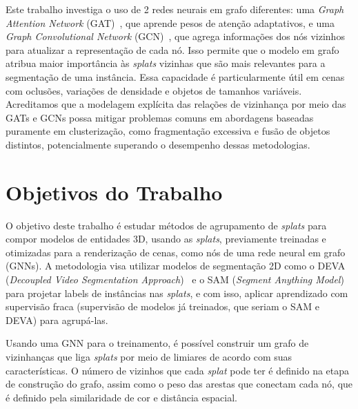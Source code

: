 Este trabalho investiga o uso de 2 redes neurais em grafo diferentes: uma \textit{Graph Attention Network} (GAT)~\cite{velivckovic2017graph}, que aprende pesos de atenção adaptativos, e uma \textit{Graph Convolutional Network} (GCN)~\cite{kipf2016semi}, que agrega informações dos nós vizinhos para atualizar a representação de cada nó. Isso permite que o modelo em grafo atribua maior importância às \emph{splats} vizinhas que são mais relevantes para a segmentação de uma instância. Essa capacidade é particularmente útil em cenas com oclusões, variações de densidade e objetos de tamanhos variáveis. Acreditamos que a modelagem explícita das relações de vizinhança por meio das GATs e GCNs possa mitigar problemas comuns em abordagens baseadas puramente em clusterização, como fragmentação excessiva e fusão de objetos distintos, potencialmente superando o desempenho dessas metodologias.

\section{Objetivos do Trabalho}

O objetivo deste trabalho é estudar métodos de agrupamento de \emph{splats} para compor modelos de entidades 3D, usando as \emph{splats}, previamente treinadas e otimizadas para a renderização de cenas, como nós de uma rede neural em grafo (GNNs). A metodologia visa utilizar modelos de segmentação 2D como o DEVA (\textit{Decoupled Video Segmentation Approach})~\cite{cheng2023tracking} e o SAM (\textit{Segment Anything Model})~\cite{kirillov2023segment} para projetar labels de instâncias nas \emph{splats}, e com isso, aplicar aprendizado com supervisão fraca (supervisão de modelos já treinados, que seriam o SAM e DEVA) para agrupá-las. 

Usando uma GNN para o treinamento, é possível construir um grafo de vizinhanças que liga \emph{splats} por meio de limiares de acordo com suas características. O número de vizinhos que cada \emph{splat} pode ter é definido na etapa de construção do grafo, assim como o peso das arestas que conectam cada nó, que é definido pela similaridade de cor e distância espacial.

